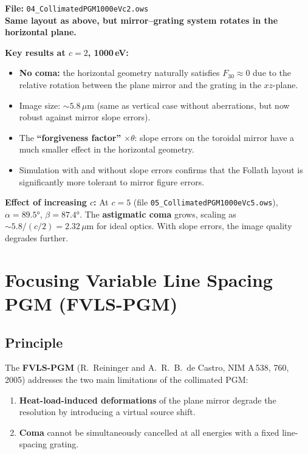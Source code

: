 \documentclass[12pt,a4paper]{article}
\newcommand{\al}{\alpha}
\newcommand{\be}{\beta}
\begin{document}
\begin{exbox}
\textbf{File:} \texttt{04\_CollimatedPGM1000eVc2.ows}\\[4pt]
\textbf{Same layout as above, but mirror--grating system rotates in the horizontal plane.}

\medskip
\textbf{Key results at $c = 2$, 1000\,eV:}
\begin{itemize}
  \item \textbf{No coma:} the horizontal geometry naturally satisfies $F_{30} \approx 0$
        due to the relative rotation between the plane mirror and the grating in the
        $xz$-plane.
  \item Image size: $\sim 5.8\,\mu$m (same as vertical case without aberrations, but now
        robust against mirror slope errors).
  \item The \textbf{``forgiveness factor''} $\times\theta$: slope errors on the toroidal
        mirror have a much smaller effect in the horizontal geometry.
  \item Simulation with and without slope errors confirms that the Follath layout is
        significantly more tolerant to mirror figure errors.
\end{itemize}

\medskip
\textbf{Effect of increasing $c$:} At $c = 5$ (file
\texttt{05\_CollimatedPGM1000eVc5.ows}), $\al = 89.5°$, $\be = 87.4°$.  The
\textbf{astigmatic coma} grows, scaling as $\sim 5.8/(c/2) = 2.32\,\mu$m for ideal
optics.  With slope errors, the image quality degrades further.
\end{exbox}

\section{Focusing Variable Line Spacing PGM (FVLS-PGM)}

\subsection{Principle}

The \textbf{FVLS-PGM} (R.\ Reininger and A.\ R.\ B.\ de Castro, NIM A\,538, 760, 2005)
addresses the two main limitations of the collimated PGM:

\begin{enumerate}
  \item \textbf{Heat-load-induced deformations} of the plane mirror degrade the resolution
        by introducing a virtual source shift.
  \item \textbf{Coma} cannot be simultaneously cancelled at all energies with a fixed
        line-spacing grating.
\end{enumerate}
\end{document}
